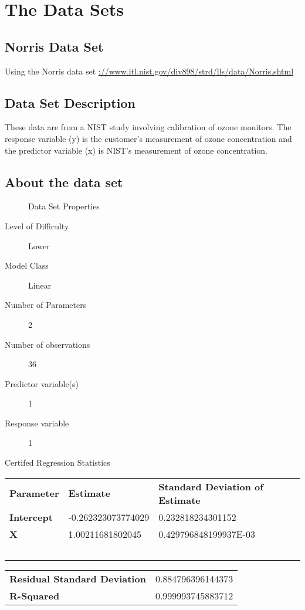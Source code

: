 \documentclass[10pt]{article}
\begin{document}
\section{The Data Sets}
\subsection{Norris Data Set}
Using the Norris data set \url{://www.itl.nist.gov/div898/strd/lls/data/Norris.shtml}
\subsection*{Data Set Description}

These data are from a NIST study involving calibration of ozone monitors. The 
response variable (y) is the customer's measurement of ozone concentration and 
the predictor variable (x) is NIST's measurement of ozone concentration.  

\subsection*{About the data set}

\begin{description}
   \item[]Data Set Properties
   \item[Level of Difficulty] Lower
   \item[Model Class] Linear
   \item[Number of Parameters] 2   
   \item[Number of observations] 36
   \item[Predictor variable(s)] 1
   \item[Response variable] 1
\end{description}

Certifed Regression Statistics

\begin{tabular}{lll}
   \textbf{Parameter} & \textbf{Estimate} & \textbf{Standard Deviation of Estimate}  \\ 
	\textbf{Intercept} & -0.262323073774029 &  0.232818234301152\\ 
	\textbf{X} & 1.00211681802045  &  0.429796848199937E-03 \\ 
	\ 
\end{tabular} 

\begin{tabular}{ll}
    \textbf{Residual Standard Deviation} &  0.884796396144373  \\ 
	 \textbf{R-Squared} & 0.999993745883712    \\  
\end{tabular}
\end{document}

